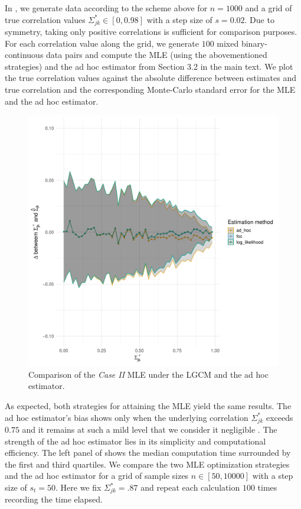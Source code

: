 In , we generate data according to the scheme above for \(n=1000\) and a grid of true correlation values \(\Sigma^*_{jk} \in [0, 0.98]\) with a step size of \(s=0.02\). Due to symmetry, taking only positive correlations is sufficient for comparison purposes. For each correlation value along the grid, we generate \(100\) mixed binary-continuous data pairs and compute the MLE (using the abovementioned strategies) and the ad hoc estimator from Section 3.2 in the main text. We plot the true correlation values against the absolute difference between estimates and true correlation and the corresponding Monte-Carlo standard error for the MLE and the ad hoc estimator.

\begin{figure}\label{fig:case2_comparison}
    \includegraphics[width=\textwidth]{Figures/case_2_difference.pdf}
    \caption{Comparison of the \textit{Case II} MLE under the LGCM and the ad hoc estimator.}
\end{figure}

As expected, both strategies for attaining the MLE yield the same results. The ad hoc estimator's bias shows only when the underlying correlation \(\Sigma^*_{jk}\) exceeds \(0.75\) and it remains at such a mild level that we consider it negligible \citep[see][for a similar observation]{Olsson82}. The strength of the ad hoc estimator lies in its simplicity and computational efficiency. The left panel of  shows the median computation time surrounded by the first and third quartiles. We compare the two MLE optimization strategies and the ad hoc estimator for a grid of sample sizes \(n \in [50, 10000]\) with a step size of \(s_t = 50\). Here we fix \(\Sigma^*_{jk} = .87\) and repeat each calculation \(100\) times recording the time elapsed.

